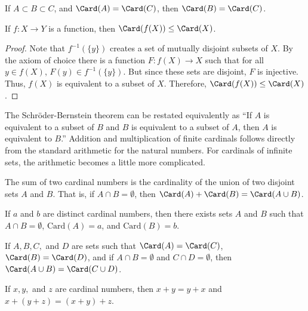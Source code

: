         \begin{theorem}
            If ${A}\subset{B}\subset{C}$, and
            $\Card(A)=\Card(C)$, then $\Card(B)=\Card(C)$.
        \end{theorem}
        \begin{theorem}
            If $f:{X}\rightarrow{Y}$ is a function,
            then $\Card(f(X))\leq\Card(X)$.
        \end{theorem}
        \begin{proof}
            Note that $f^{-1}(\{y\})$ creates a set of mutually disjoint
            subsets of $X$. By the axiom of choice there is a function
            $F:{f(X)}\rightarrow{X}$ such that for all ${y}\in{f(X)}$,
            ${F(y)}\in{f^{-1}(\{y\})}$. But since these sets are disjoint,
            $F$ is injective. Thus, $f(X)$ is equivalent to a subset of $X$.
            Therefore, $\Card(f(X))\leq\Card(X)$.
        \end{proof}
        The Schr\"{o}der-Bernstein theorem can be restated equivalently as
        ``If $A$ is equivalent to a subset of $B$ and $B$ is equivalent to a
        subset of $A$, then $A$ is equivalent to $B$.'' Addition and
        multiplication of finite cardinals follows directly from the standard
        arithmetic for the natural numbers. For cardinals of infinite sets,
        the arithmetic becomes a little more complicated.
        \begin{definition}
            The sum of two cardinal numbers is the cardinality of the union of two
            disjoint sets $A$ and $B$. That is, if ${A}\cap{B}=\emptyset$, then
            $\Card(A)+\Card(B)=\Card({A}\cup{B})$.
        \end{definition}
        \begin{theorem}
            If $a$ and $b$ are distinct cardinal numbers, then there exists sets $A$
            and $B$ such that ${A}\cap{B}=\emptyset$, $\textrm{Card}(A)=a$, and
            $\textrm{Card}(B)=b$.
        \end{theorem}
        \begin{theorem}
            If $A,B,C,$ and $D$ are sets such that $\Card(A)=\Card(C)$,
            $\Card(B)=\Card(D)$, and if ${A}\cap{B}=\emptyset$ and
            ${C}\cap{D}=\emptyset$, then
            $\Card({A}\cup{B})=\Card({C}\cup{D})$.
        \end{theorem}
        \begin{theorem}
            If $x,y,$ and $z$ are cardinal numbers, then
            $x+y=y+x$ and $x+(y+z)=(x+y)+z$.
        \end{theorem}
